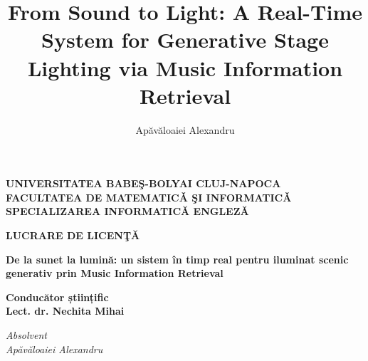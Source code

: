 \documentclass[12pt]{report}
\begin{document}
\title{From Sound to Light: A Real-Time System for Generative Stage Lighting via Music Information Retrieval}			   
\author{Apăvăloaiei Alexandru}								
				
\maketitle

\begin{titlepage}
\begin{center}
{\Large\textbf{
UNIVERSITATEA BABEŞ-BOLYAI CLUJ-NAPOCA \\
FACULTATEA DE MATEMATICǍ ŞI INFORMATICǍ \\
SPECIALIZAREA INFORMATICĂ ENGLEZĂ \\
}}
\end{center}


\begin{center}
{\Huge\textbf{LUCRARE DE LICEN\c T\u A}}
\end{center}


\begin{center}
{\huge\textbf{De la sunet la lumină: un sistem în timp real pentru iluminat scenic generativ prin Music Information Retrieval}}
\end{center}


\begin{flushleft}
{\Large\textbf{Conducător științific \\ Lect. dr. Nechita Mihai}}
\end{flushleft}


\begin{flushright}
{\Large\textit{Absolvent\\ Apăvăloaiei Alexandru}}
\end{flushright}


\begin{center}
{\Large{\the\year}}
\end{center}

\end{titlepage}
\end{document}
